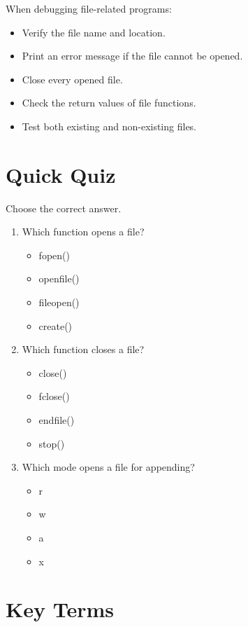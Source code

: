 \documentclass[12pt,openany]{book}
\begin{document}
When debugging file-related programs:

\begin{itemize}
    \item Verify the file name and location.
    \item Print an error message if the file cannot be opened.
    \item Close every opened file.
    \item Check the return values of file functions.
    \item Test both existing and non-existing files.
\end{itemize}

\section{Quick Quiz}

Choose the correct answer.

\begin{enumerate}
    \item Which function opens a file?
    \begin{itemize}
        \item fopen()
        \item openfile()
        \item fileopen()
        \item create()
    \end{itemize}

    \item Which function closes a file?
    \begin{itemize}
        \item close()
        \item fclose()
        \item endfile()
        \item stop()
    \end{itemize}

    \item Which mode opens a file for appending?
    \begin{itemize}
        \item r
        \item w
        \item a
        \item x
    \end{itemize}
\end{enumerate}

\section{Key Terms}
\end{document}
